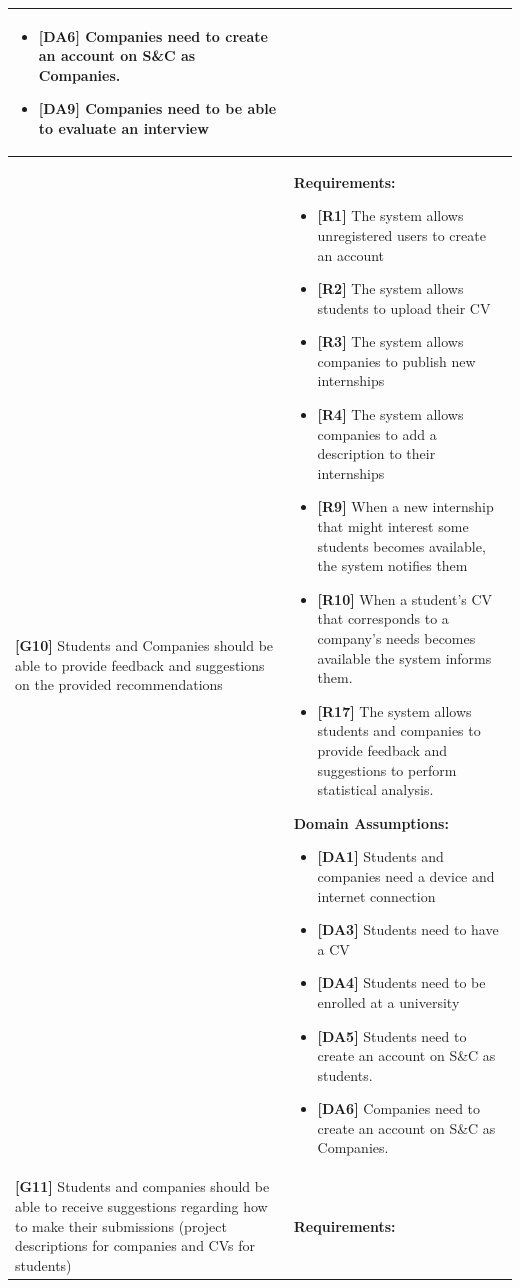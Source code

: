 \begin{longtable}{|p{}|p{}|}
\begin{itemize}
    \item \textbf{[DA6]} Companies need to create an account on S\&C as Companies.
    \item \textbf{[DA9]} Companies need to be able to evaluate an interview
\end{itemize} \\
\hline
\textbf{[G10]} Students and Companies should be able to provide feedback and suggestions on the provided recommendations
& 
\textbf{Requirements:}
\begin{itemize}
    \item \textbf{[R1]} The system allows unregistered users to create an account
    \item \textbf{[R2]} The system allows students to upload their CV
    \item \textbf{[R3]} The system allows companies to publish new internships
    \item \textbf{[R4]} The system allows companies to add a description to their internships
    \item  \textbf{[R9]} When a new internship that might interest some students becomes available, the system notifies them
    \item  \textbf{[R10]} When a student’s CV that corresponds to a company’s needs becomes available the system informs them.
    \item \textbf{[R17]} The system allows students and companies to provide feedback and suggestions to perform statistical analysis.
\end{itemize}
\textbf{Domain Assumptions:}
\begin{itemize}
    \item \textbf{[DA1]} Students and companies need a device and internet connection
     \item \textbf{[DA3]} Students need to have a CV
     \item \textbf{[DA4]} Students need to be enrolled at a university
    \item \textbf{[DA5]} Students need to create an account on S\&C as students.
    \item \textbf{[DA6]} Companies need to create an account on S\&C as Companies.
\end{itemize} \\
\hline
\textbf{[G11]} Students and companies should be able to receive suggestions regarding how to make their submissions (project descriptions for companies and CVs for students)
& 
\textbf{Requirements:}
\begin{itemize}

\end{itemize}
\end{longtable}
